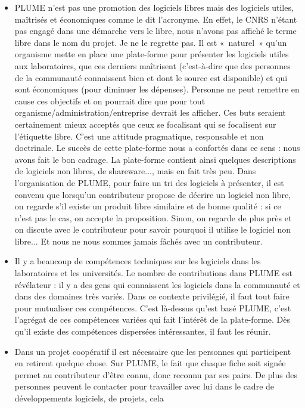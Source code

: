 \documentclass{FramateX}
\begin{document}
\begin{refsection}
\begin{itemize}
\item PLUME n'est pas une promotion des logiciels libres mais des
logiciels utiles, maîtrisés et économiques comme le dit l'acronyme. En
effet, le CNRS n'étant pas engagé dans une démarche vers le libre, nous
n'avons pas affiché le terme libre dans le nom du projet. Je ne le
regrette pas. Il est «~naturel~» qu'un organisme mette en place une
plate-forme pour présenter les logiciels utiles aux laboratoires, que
ces derniers maîtrisent (c'est-à-dire que des personnes de la
communauté connaissent bien et dont le source est disponible) et qui
sont économiques (pour diminuer les dépenses). Personne ne peut
remettre en cause ces objectifs et on pourrait dire que pour tout
organisme/administration/entreprise devrait les afficher. Ces buts
seraient certainement mieux acceptés que ceux se focalisant qui se
focalisent sur l'étiquette libre. C'est une attitude pragmatique,
responsable et non doctrinale. Le succès de cette plate-forme nous a
confortés dans ce sens : nous avons fait le bon cadrage. La plate-forme
contient ainsi quelques descriptions de logiciels non libres, de
shareware..., mais en fait très peu. Dans l'organisation de PLUME, pour
faire un tri des logiciels à présenter, il est convenu que lorsqu'un
contributeur propose de décrire un logiciel non libre, on regarde s'il
existe un produit libre similaire et de bonne qualité : si ce n'est pas
le cas, on accepte la proposition. Sinon, on regarde de plus près et on
discute avec le contributeur pour savoir pourquoi il utilise le
logiciel non libre... Et nous ne nous sommes jamais fâchés avec un
contributeur.
\item Il y a beaucoup de compétences techniques sur les logiciels dans
les laboratoires et les universités. Le nombre de contributions dans
PLUME est révélateur : il y a des gens qui connaissent les logiciels
dans la communauté et dans des domaines très variés. Dans ce contexte
privilégié, il faut tout faire pour mutualiser ces compétences. C'est
là-dessus qu'est basé PLUME, c'est l'agrégat de ces compétences variées
qui fait l'intérêt de la plate-forme. Dès qu'il existe des compétences
dispersées intéressantes, il faut les réunir.
\item Dans un projet coopératif il est nécessaire que les personnes qui
participent en retirent quelque chose. Sur PLUME, le fait que chaque
fiche soit signée permet au contributeur d'être connu, donc reconnu par
ses pairs. De plus des personnes peuvent le contacter pour travailler
avec lui dans le cadre de développements logiciels, de projets, cela

\end{itemize}
\end{refsection}
\end{document}

